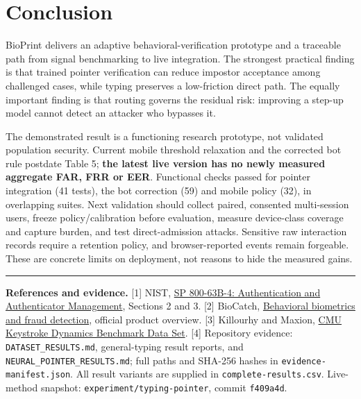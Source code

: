 \documentclass[10pt,a4paper]{article}
\begin{document}
\section{Conclusion}
BioPrint delivers an adaptive behavioral-verification prototype and a traceable path from signal benchmarking to live integration. The strongest practical finding is that trained pointer verification can reduce impostor acceptance among challenged cases, while typing preserves a low-friction direct path. The equally important finding is that routing governs the residual risk: improving a step-up model cannot detect an attacker who bypasses it.

The demonstrated result is a functioning research prototype, not validated population security. Current mobile threshold relaxation and the corrected bot rule postdate Table 5; \textbf{the latest live version has no newly measured aggregate FAR, FRR or EER}. Functional checks passed for pointer integration (41 tests), the bot correction (59) and mobile policy (32), in overlapping suites. Next validation should collect paired, consented multi-session users, freeze policy/calibration before evaluation, measure device-class coverage and capture burden, and test direct-admission attacks. Sensitive raw interaction records require a retention policy, and browser-reported events remain forgeable. These are concrete limits on deployment, not reasons to hide the measured gains.

\vspace{2pt}\hrule\vspace{3pt}
{\scriptsize\textbf{References and evidence.}
[1] NIST, \href{https://pages.nist.gov/800-63-4/sp800-63b.html}{SP 800-63B-4: Authentication and Authenticator Management}, Sections 2 and 3.
[2] BioCatch, \href{https://www.biocatch.com/what-we-do}{Behavioral biometrics and fraud detection}, official product overview.
[3] Killourhy and Maxion, \href{https://www.cs.cmu.edu/~keystroke/}{CMU Keystroke Dynamics Benchmark Data Set}.
[4] Repository evidence: \texttt{DATASET\_RESULTS.md}, general-typing result reports, and \texttt{NEURAL\_POINTER\_RESULTS.md}; full paths and SHA-256 hashes in \texttt{evidence-manifest.json}. All result variants are supplied in \texttt{complete-results.csv}. Live-method snapshot: \texttt{experiment/typing-pointer}, commit \texttt{f409a4d}.}
\end{document}
